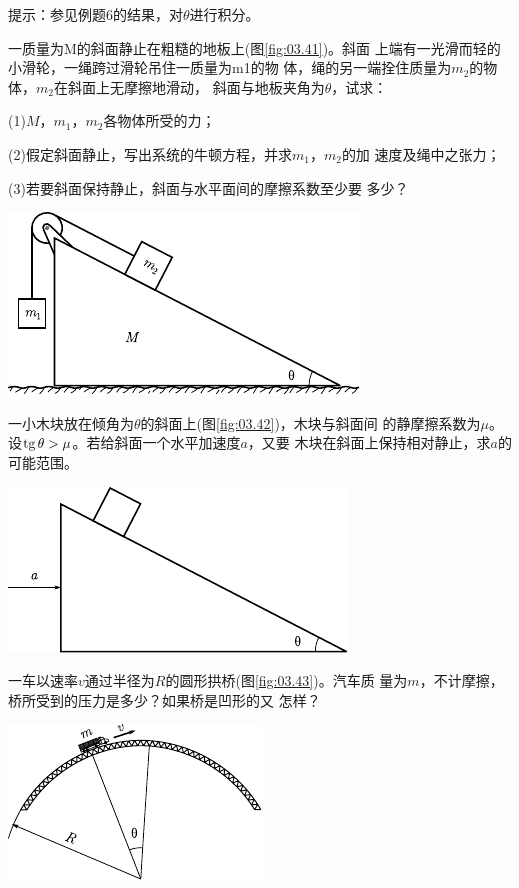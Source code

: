 \begin{exercises}
\lhbrak 提示：参见例题6的结果，对$ \theta $进行积分。\rhbrak

\exercise 一质量为M的斜面静止在粗糙的地板上(图\ref{fig:03.41})。斜面
上端有一光滑而轻的小滑轮，一绳跨过滑轮吊住一质量为m1的物
体，绳的另一端拴住质量为$ m_2 $的物体，$ m _ { 2 } $在斜面上无摩擦地滑动，
斜面与地板夹角为$ \theta $，试求：

(1)$ M $，$ m _ { 1 } $，$  m _ { 2 }  $各物体所受的力；

(2)假定斜面静止，写出系统的牛顿方程，并求$ m_1 $，$ m_2 $的加
速度及绳中之张力；

(3)若要斜面保持静止，斜面与水平面间的摩擦系数至少要
多少？
\begin{figurex}
	\centering
	\includegraphics{figure/fig03.41}
	\caption{}
	\label{fig:03.41}
\end{figurex}

\exercise 一小木块放在倾角为$ \theta $的斜面上(图\ref{fig:03.42})，木块与斜面间
的静摩擦系数为$ \mu $。设$  \operatorname{tg} \theta > \mu $。若给斜面一个水平加速度$ a $，又要
木块在斜面上保持相对静止，求$ a $的可能范围。
\begin{figurex}
	\centering
	\includegraphics{figure/fig03.42}
	\caption{}
	\label{fig:03.42}
\end{figurex}

\exercise 一车以速率$ v $通过半径为$ R $的圆形拱桥(图\ref{fig:03.43})。汽车质
量为$ m $，不计摩擦，桥所受到的压力是多少？如果桥是凹形的又
怎样？
\begin{figurex}
	\centering
	\includegraphics{figure/fig03.43}
	\caption{}
	\label{fig:03.43}
\end{figurex}
\end{exercises}